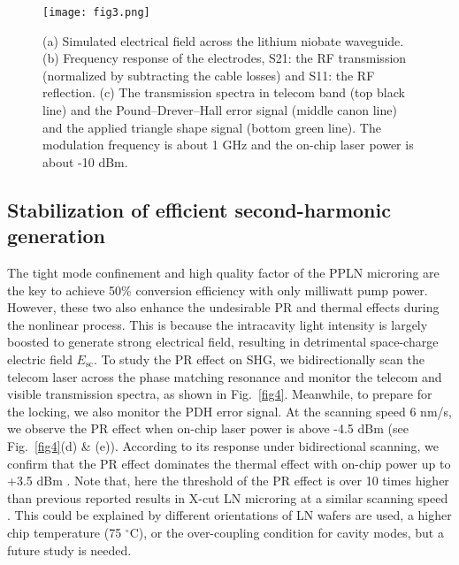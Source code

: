 \documentclass{WileyMSP-template}
\begin{document}
\begin{figure}
  \texttt{[image: fig3.png]}
  \caption{(a) Simulated electrical field across the lithium niobate waveguide. (b) Frequency response of the electrodes, S21: the RF transmission (normalized by subtracting the cable losses) and S11: the RF reflection. (c) The transmission spectra in telecom band (top black line) and the Pound–Drever–Hall error signal (middle canon line) and the applied triangle shape signal (bottom green line). The modulation frequency is about 1 GHz and the on-chip laser power is about -10 dBm. }
  \label{fig3}
\end{figure}
\subsection{Stabilization of efficient second-harmonic generation}
The tight mode confinement and high quality factor of the PPLN microring are the key to achieve 50$\%$ conversion efficiency with only milliwatt pump power. However, these two also enhance the undesirable PR and thermal effects during the nonlinear process. This is because the intracavity light intensity is largely boosted to generate strong electrical field, resulting in detrimental space-charge electric field $E_\mathrm{sc}$. To study the PR effect on SHG, we bidirectionally scan the telecom laser across the phase matching resonance and monitor the telecom and visible transmission spectra, as shown in Fig.~\ref{fig4}. Meanwhile, to prepare for the locking, we also monitor the PDH error signal. At the scanning speed 6 nm/s, we observe the PR effect when on-chip laser power is above -4.5 dBm (see Fig.~\ref{fig4}(d) \& (e)). According to its response under bidirectional scanning, we confirm that the PR effect dominates the thermal effect \cite{wang2019monolithic} with on-chip power up to +3.5 dBm . Note that, here the threshold of the PR effect is over 10 times higher than previous reported results in X-cut LN microring at a similar scanning speed \cite{Xu:21}. This could be explained by different orientations of LN wafers are used, a higher chip temperature (75 $^\circ$C), or the over-coupling condition for cavity modes, but a future study is needed. 
\end{document}
